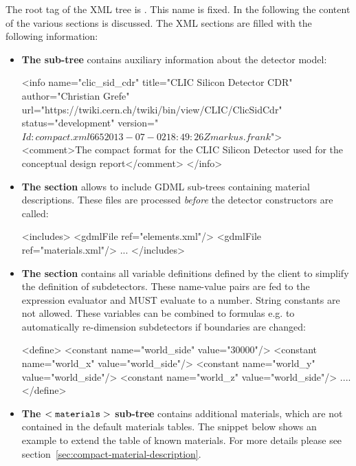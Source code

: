 \documentclass[10pt,a4paper]{article}
\begin{document}
\noindent
The root tag of the XML tree is {}. This name is fixed.
In the following the content of the various sections is discussed.
The XML sections are filled with the following information:
\begin{itemize}
\item {\bf{The  sub-tree}} contains auxiliary information about 
       the detector model:

\begin{code}
<info name="clic_sid_cdr"
      title="CLIC Silicon Detector CDR"
      author="Christian Grefe"
      url="https://twiki.cern.ch/twiki/bin/view/CLIC/ClicSidCdr"
      status="development"
      version="$Id: compact.xml 665 2013-07-02 18:49:26Z markus.frank $">
      <comment>The compact format for the CLIC Silicon Detector used 
               for the conceptual design report</comment>        
</info>
\end{code}

\item {\bf{The  section}} allows to include GDML sub-trees containing
       material descriptions. These files are processed {\it{before}} the 
       detector constructors are called:

\begin{code}
<includes>
      <gdmlFile  ref="elements.xml"/>
      <gdmlFile  ref="materials.xml"/>
      ...
</includes>
\end{code}

\item {\bf{The  section}} contains all variable definitions
       defined by the client to simplify the definition of subdetectors.
       These name-value pairs are fed to the expression evaluator
       and MUST evaluate to a number. String constants are not allowed.
       These variables can be combined to formulas e.g. to automatically 
       re-dimension subdetectors if boundaries are changed:

\begin{code}
<define>
      <constant name="world_side" value="30000"/>
      <constant name="world_x" value="world_side"/>
      <constant name="world_y" value="world_side"/>
      <constant name="world_z" value="world_side"/>
      ....
</define>
\end{code}

\item  {\bf{The $\tt<materials>$ sub-tree}} contains additional materials, which
      are not contained in the default materials tables. The snippet below shows
      an example to extend the table of known materials. For more details please see 
      section~\ref{sec:compact-material-description}.


\end{itemize}
\end{document}
